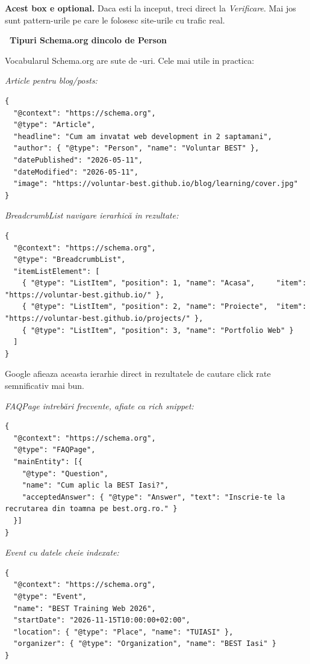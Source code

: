 \begin{bonusbox}
\textbf{Acest box e optional.} Daca esti la inceput, treci direct la \emph{Verificare}. Mai jos sunt pattern-urile pe care le folosesc site-urile cu trafic real.

\medskip

\textbf{\faSitemap\ Tipuri Schema.org dincolo de Person}

Vocabularul Schema.org are sute de -uri. Cele mai utile in practica:

\medskip

\emph{Article \textendash{} pentru blog/posts:}
\begin{lstlisting}[style=html, numbers=none]
{
  "@context": "https://schema.org",
  "@type": "Article",
  "headline": "Cum am invatat web development in 2 saptamani",
  "author": { "@type": "Person", "name": "Voluntar BEST" },
  "datePublished": "2026-05-11",
  "dateModified": "2026-05-11",
  "image": "https://voluntar-best.github.io/blog/learning/cover.jpg"
}
\end{lstlisting}

\emph{BreadcrumbList \textendash{} navigare ierarhic\u a in rezultate:}
\begin{lstlisting}[style=html, numbers=none]
{
  "@context": "https://schema.org",
  "@type": "BreadcrumbList",
  "itemListElement": [
    { "@type": "ListItem", "position": 1, "name": "Acasa",     "item": "https://voluntar-best.github.io/" },
    { "@type": "ListItem", "position": 2, "name": "Proiecte",  "item": "https://voluntar-best.github.io/projects/" },
    { "@type": "ListItem", "position": 3, "name": "Portfolio Web" }
  ]
}
\end{lstlisting}
Google afieaza aceasta ierarhie direct in rezultatele de cautare \textendash{} click rate semnificativ mai bun.

\emph{FAQPage \textendash{} intreb\u ari frecvente, afiate ca rich snippet:}
\begin{lstlisting}[style=html, numbers=none]
{
  "@context": "https://schema.org",
  "@type": "FAQPage",
  "mainEntity": [{
    "@type": "Question",
    "name": "Cum aplic la BEST Iasi?",
    "acceptedAnswer": { "@type": "Answer", "text": "Inscrie-te la recrutarea din toamna pe best.org.ro." }
  }]
}
\end{lstlisting}

\emph{Event \textendash{} cu datele cheie indexate:}
\begin{lstlisting}[style=html, numbers=none]
{
  "@context": "https://schema.org",
  "@type": "Event",
  "name": "BEST Training Web 2026",
  "startDate": "2026-11-15T10:00:00+02:00",
  "location": { "@type": "Place", "name": "TUIASI" },
  "organizer": { "@type": "Organization", "name": "BEST Iasi" }
}
\end{lstlisting}


\end{bonusbox}
